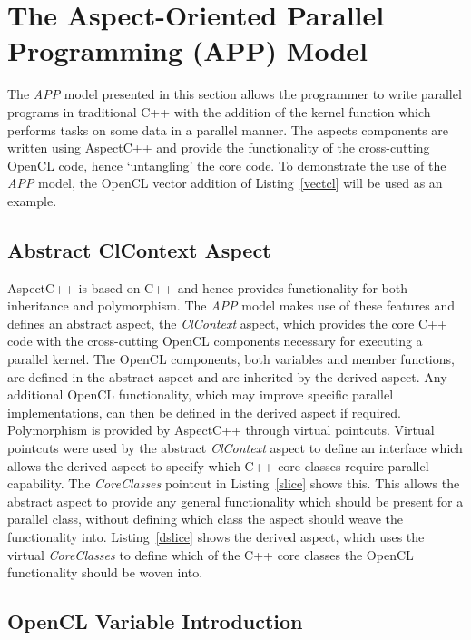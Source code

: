 \documentclass{sig-alternate-05-2015}
\begin{document}
\section{The Aspect-Oriented Parallel \\ Programming (APP) Model}\label{sec:aspects}

The \textit{APP} model presented in this section allows the programmer to
write parallel programs in traditional C++ with the addition of the kernel
function which performs tasks on some data in a parallel manner. The aspects
components are written using AspectC++ and provide the functionality of the
cross-cutting OpenCL code, hence `untangling' the core code. To demonstrate the
use of the \textit{APP} model, the OpenCL vector addition of
Listing~\ref{vectcl} will be used as an example. 

\subsection{Abstract ClContext Aspect}

AspectC++ is based on C++ and hence provides functionality for both inheritance
and polymorphism. The \textit{APP} model makes use of these features and defines
an abstract aspect, the \textit{ClContext} aspect, which provides the core C++ code with 
the cross-cutting OpenCL components necessary for executing a parallel kernel.
The OpenCL  components, both variables and member functions, are defined in the abstract 
aspect and are inherited by the derived aspect. Any additional OpenCL
functionality, which may improve specific parallel implementations, can then be 
defined in the derived aspect if required. Polymorphism is provided by AspectC++ 
through virtual pointcuts. Virtual pointcuts were used by the abstract
\textit{ClContext} aspect to define an interface which allows the derived aspect
to specify which C++ core classes require parallel capability.
The \textit{CoreClasses} pointcut in Listing~\ref{slice} shows this. This allows
the abstract aspect to provide any general functionality which should be present
for a parallel class, without defining which class the aspect should weave the
functionality into. Listing~\ref{dslice} shows the derived aspect, which uses
the virtual \textit{CoreClasses} to define which of the C++ core classes the
OpenCL functionality should be woven into.

\subsection{OpenCL Variable Introduction}
\end{document}
